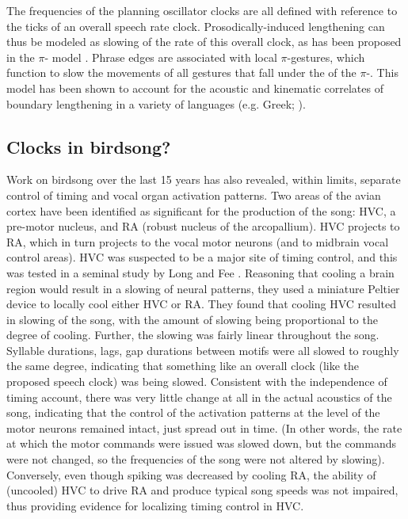 \documentclass[output=paper,
modfonts
]{LSP/langsci}
\begin{document}
\newpage  
The frequencies of the planning oscillator clocks are all defined with reference to the ticks of  an overall speech rate clock. Prosodically-induced lengthening can thus be modeled as slowing of the rate of this overall clock, as has been proposed in the $\pi$- model \citep{Byrd2003}. Phrase edges are associated with local $\pi$-gestures, which function to slow the movements of all gestures that fall under the  of the $\pi$-. This model has been shown to account for the acoustic and kinematic correlates of boundary lengthening in a variety of languages (e.g. Greek; \citealt{Katsika2014}).

\subsection{Clocks in birdsong?}

Work on birdsong over the last 15 years has also revealed, within limits, separate control of timing and vocal organ activation patterns. Two areas of the avian cortex have been identified as significant  for the production of the song: HVC, a pre-motor nucleus, and RA (robust nucleus of the arcopallium).  HVC projects to RA, which in turn projects to the vocal motor neurons (and to midbrain vocal control areas). HVC was suspected to be a major site of timing control, and this was tested in a seminal study by Long and Fee \citeyearpar{Long2008}. Reasoning that cooling a brain region would result in a slowing of neural patterns, they used a miniature Peltier device to locally cool either HVC or RA. They found that cooling HVC resulted in slowing of the song, with the amount of slowing being proportional to the degree of cooling.  Further, the slowing was fairly linear throughout the song. Syllable durations,  lags, gap durations between motifs were all slowed to roughly the same degree, indicating that something like an overall clock (like the proposed speech clock) was being slowed. Consistent with the independence of timing account, there was very little change at all in the actual acoustics of the song, indicating that the control of the activation patterns at the level of the motor neurons remained intact, just spread out in time. (In other words, the rate at which the motor commands were issued was slowed down, but the commands were not changed, so the frequencies of the song were not altered by slowing). Conversely, even though spiking was decreased by cooling RA, the ability of (uncooled) HVC to drive RA and produce typical song speeds was not impaired, thus providing evidence for localizing timing control in HVC.
\end{document}
